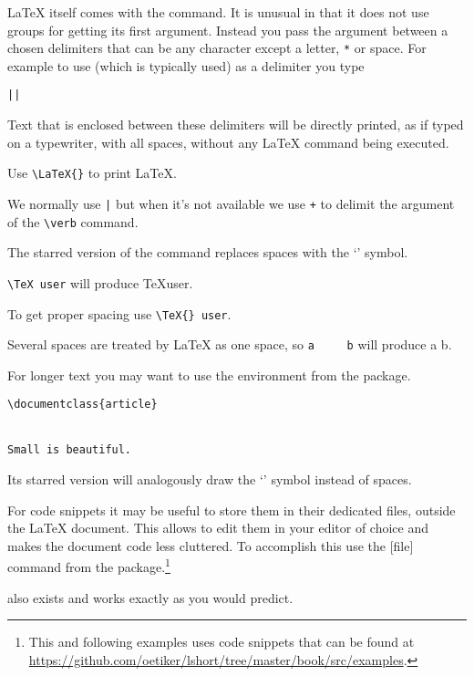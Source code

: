 \LaTeX{} itself comes with the  command. It is unusual in that it does
not use groups for getting its first argument. Instead you pass the argument between a
chosen delimiters that can be any character except a letter, \verb|*| or
space. For example to use \cargv{|} (which is typically used) as a delimiter
you type
\begin{lscommand}
  \verb+|+\verb+|+
\end{lscommand}
Text that is enclosed between these delimiters will be directly printed, as if
typed on a typewriter, with all spaces, without any \LaTeX{} command being
executed.
\begin{example}
Use \verb|\LaTeX{}| to 
print \LaTeX.

We normally use \verb+|+ but
when it's not available we
use \verb|+| to delimit the
argument of the \verb|\verb|
command.
\end{example}

The starred version of the  command replaces spaces with the
\enquote*{\textvisiblespace{}} symbol.

\begin{chktexignore}
\begin{example}
\verb*|\TeX user| will
produce \TeX user.

To get proper spacing use
\verb*|\TeX{} user|.

Several spaces are treated
by \LaTeX{} as one space, 
so \verb*|a     b| will
produce a     b.
\end{example}
\end{chktexignore}

For longer text you may want to use the  environment from the
 package.
\begin{example}
\begin{verbatim}
\documentclass{article}


Small is beautiful.

\end{verbatim}
\end{example}
Its starred version will analogously draw the \enquote*{\textvisiblespace}
symbol instead of spaces.

For code snippets it may be useful to store them in their dedicated files,
outside the \LaTeX{} document. This allows to edit them in your editor of
choice and makes the document code less cluttered. To accomplish this use the
[file] command from the  package.\footnote{This
  and following examples uses code snippets that can be found at \url{https://github.com/oetiker/lshort/tree/master/book/src/examples}.}
\begin{example}

\end{example}
 also exists and works exactly as you would predict.

